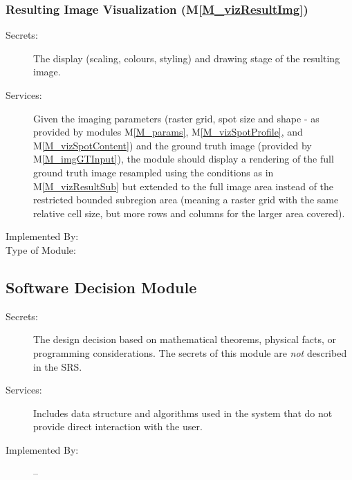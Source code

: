 \documentclass[12pt, titlepage]{article}
\newcommand{\mref}[1]{M\ref{#1}}
\begin{document}
\subsubsection{Resulting Image Visualization (\mref{M_vizResultImg})}
\begin{description}
\item[Secrets:]The display (scaling, colours, styling) and drawing stage 
  of the resulting image.
\item[Services:]Given the imaging parameters (raster grid, spot size and shape -
  as provided by modules \mref{M_params}, \mref{M_vizSpotProfile}, and \mref{M_vizSpotContent})
  and the ground truth image (provided by \mref{M_imgGTInput}),
  the module should display a rendering of the full ground truth image resampled
  using the conditions as in \mref{M_vizResultSub} but extended to the full image area
  instead of the restricted bounded subregion area (meaning a raster grid with the same
  relative cell size, but more rows and columns for the larger area covered).
\item[Implemented By:] \progname{}
\item[Type of Module:] 
\end{description}



\subsection{Software Decision Module}

\begin{description}
\item[Secrets:] The design decision based on mathematical theorems, physical
  facts, or programming considerations. The secrets of this module are
  \emph{not} described in the SRS.
\item[Services:] Includes data structure and algorithms used in the system that
  do not provide direct interaction with the user. 
\item[Implemented By:] --
\end{description}

\end{document}
